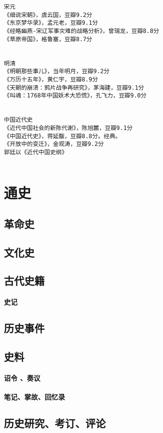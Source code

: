 \documentclass[UTF8]{../../RepresentationUniverse}
\begin{document}
\begin{lstlisting}
宋元
《细说宋朝》，虞云国，豆瓣9.2分
《东京梦华录》，孟元老，豆瓣9.1分
《经略幽燕-宋辽军事灾难的战略分析》，曾瑞龙，豆瓣8.8分
《草原帝国》，格鲁塞，豆瓣8.7分


明清
《明朝那些事儿》，当年明月，豆瓣9.2分
《万历十五年》，黄仁宇，豆瓣8.9分
《天朝的崩溃：鸦片战争再研究》，茅海建，豆瓣9.1分
《叫魂：1768年中国妖术大恐慌》，孔飞力，豆瓣9.0分


中国近代史
《近代中国社会的新陈代谢》，陈旭麓，豆瓣9.1分
《中国近代史》，蒋延黻，豆瓣8.8分。经典。
《开放中的变迁》，金观涛，豆瓣9.2分
郭廷以《近代中国史纲》


\end{lstlisting}





\chapter{通史}
\section{革命史}
\section{文化史}
\section{古代史籍}
    \subsubsection{史记}
\section{历史事件}
\section{史料}
    \subsubsection{诏令 、奏议}
    \subsubsection{笔记、掌故、回忆录}
\section{历史研究、考订、评论}
\end{document}

